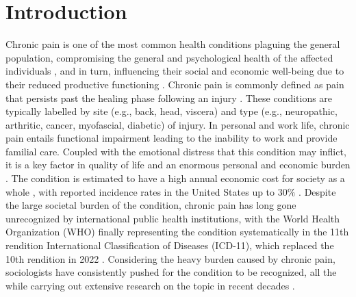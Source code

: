 \section{Introduction}
\label{section:Introduction}
Chronic pain is one of the most common health conditions plaguing the general population, compromising the general and psychological health of the affected individuals \citep{becker1997pain, gureje1998persistent}, and in turn, influencing their social and economic well-being due to their reduced productive functioning \citep{latham1994socioeconomic}. Chronic pain is commonly defined as pain that persists past the healing phase following an injury \citep{merskey1986classification}. These conditions are typically labelled by site (e.g., back, head, viscera) and type (e.g., neuropathic, arthritic, cancer, myofascial, diabetic) \citep{APKARIAN200981} of injury. In personal and work life, chronic pain entails functional impairment leading to the inability to work and provide familial care. Coupled with the emotional distress that this condition may inflict, it is a key factor in quality of life and an enormous personal and economic burden \citep{duenas2016review}. The condition is estimated to have a high annual economic cost for society as a whole \citep{bp-cost}, with reported incidence rates in the United States up to $30\%$ \citep{johannes2010prevalence}. Despite the large societal burden of the condition, chronic pain has long gone unrecognized by international public health institutions, with the World Health Organization (WHO) finally representing the condition systematically in the 11th rendition International Classification of Diseases (ICD-11), which replaced the 10th rendition in 2022 \citep{ICD-11}. Considering the heavy burden caused by chronic pain, sociologists have consistently pushed for the condition to be recognized, all the while carrying out extensive research on the topic in recent decades \citep{gatchel2007biopsychosocial}. 

